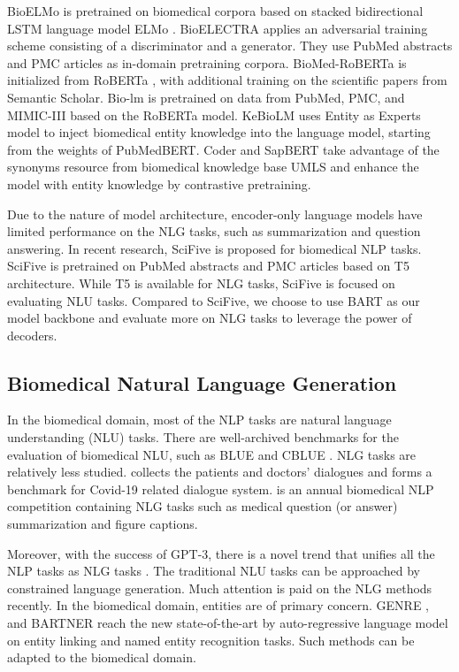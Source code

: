\documentclass[11pt]{article}
\begin{document}
BioELMo \cite{Jin2019ProbingBE} is pretrained on biomedical corpora based on stacked bidirectional LSTM language model ELMo \cite{elmo}. BioELECTRA \cite{Kanakarajan2021BioELECTRAPretrainedBT} applies an adversarial training scheme consisting of a discriminator and a generator. They use PubMed abstracts and PMC articles as in-domain pretraining corpora.  BioMed-RoBERTa \cite{Gururangan2020DontSP} is initialized from RoBERTa \cite{Liu2019RoBERTaAR}, with additional training on the scientific papers from Semantic Scholar. Bio-lm \cite{biolm} is pretrained on data from PubMed, PMC, and MIMIC-III based on the RoBERTa model. 
KeBioLM \cite{kebiolm} uses Entity as Experts \cite{fevry-etal-2020-entities} model to inject biomedical entity knowledge into the language model, starting from the weights of PubMedBERT. Coder \cite{coder} and SapBERT \cite{sapbert} take advantage of the synonyms resource from biomedical knowledge base UMLS \cite{umls} and enhance the model with entity knowledge by contrastive pretraining. 

Due to the nature of model architecture, encoder-only language models have limited performance on the NLG tasks, such as summarization and question answering. In recent research, SciFive \cite{Phan2021SciFiveAT} is proposed for biomedical NLP tasks.
SciFive is pretrained on PubMed abstracts and PMC articles based on T5 architecture. 
While T5 is available for NLG tasks, SciFive is focused on evaluating NLU tasks.
Compared to SciFive, we choose to use BART as our model backbone and evaluate more on NLG tasks to leverage the power of decoders.




\subsection{Biomedical Natural Language Generation}

In the biomedical domain, most of the NLP tasks are natural language understanding (NLU) tasks. There are well-archived benchmarks for the evaluation of biomedical NLU, such as BLUE \cite{pubmedbert} and CBLUE \cite{zhang2021cblue}. NLG tasks are relatively less studied. \cite{ju2020CovidDialog} collects the patients and doctors' dialogues and forms a benchmark for Covid-19 related dialogue system. \cite{mediqa} is an annual biomedical NLP competition containing NLG tasks such as medical question (or answer) summarization and figure captions.

Moreover, with the success of GPT-3, there is a novel trend that unifies all the NLP tasks as NLG tasks \cite{nlpdeca,GPT3}. The traditional NLU tasks can be approached by constrained language generation. Much attention is paid on the NLG methods recently. In the biomedical domain, entities are of primary concern. GENRE \cite{GENRE}, \citet{oursnaaclshort} and BARTNER \cite{bartner} reach the new state-of-the-art by auto-regressive language model on entity linking and named entity recognition tasks. Such methods can be adapted to the biomedical domain. 
\end{document}
